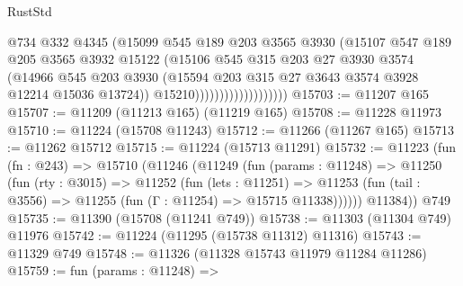 \begin{lexlean}{RustStd}
\begin{coremodule}
                                    @734
                                    @332
                                    @4345
                                    (@15099
                                      @545
                                      @189
                                      @203
                                      @3565
                                      @3930
                                      (@15107
                                        @547
                                        @189
                                        @205
                                        @3565
                                        @3932
                                        @15122
                                        (@15106
                                          @545
                                          @315
                                          @203
                                          @27
                                          @3930
                                          @3574
                                          (@14966
                                            @545
                                            @203
                                            @3930
                                            (@15594
                                              @203
                                              @315
                                              @27
                                              @3643
                                              @3574
                                              @3928
                                              @12214
                                              @15036
                                              @13724))
                                          @15210)))))))))))))))))))
@15703 := @11207 @165
@15707 := @11209 (@11213 @165) (@11219 @165)
@15708 := @11228 @11973
@15710 := @11224 (@15708 @11243)
@15712 := @11266 (@11267 @165)
@15713 := @11262 @15712
@15715 := @11224 (@15713 @11291)
@15732 := @11223
    (fun (fn : @243) =>
    @15710
      (@11246
        (@11249
          (fun (params : @11248) =>
          @11250
            (fun (rty : @3015) =>
            @11252
              (fun (lets : @11251) =>
              @11253 (fun (tail : @3556) => @11255 (fun (Γ : @11254) => @15715 @11338))))))
        @11384))
    @749
@15735 := @11390 (@15708 (@11241 @749))
@15738 := @11303 (@11304 @749) @11976
@15742 := @11224 (@11295 (@15738 @11312) @11316)
@15743 := @11329 @749
@15748 := @11326 (@11328 @15743 @11979 @11284 @11286)
@15759 := fun (params : @11248) =>

\end{coremodule}
\end{lexlean}
